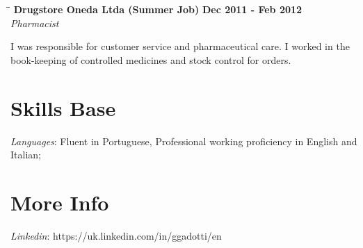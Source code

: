 \documentclass[margin]{res}
\begin{document}
\begin{resume}
\vspace{-0.1in}
   \begin{tabbing}
   \hspace{2.3in}\= \hspace{1.7in}\= \kill %
    \textbf{Drugstore Oneda Ltda (Summer Job)}    \>\>\textbf{Dec 2011 - Feb 2012}\\
    \textit{Pharmacist}\\   
   \end{tabbing}\vspace{-20pt}      %
I was responsible for customer service and pharmaceutical care. I worked in the book-keeping of controlled
medicines and stock control for orders.

\section{Skills Base}
			\textit{Languages}: Fluent in Portuguese, Professional working proficiency in English and Italian;
 
\section{More Info}
      \textit{Linkedin}: https://uk.linkedin.com/in/ggadotti/en

\end{resume}
\center{\LaTeX}
\end{document}
